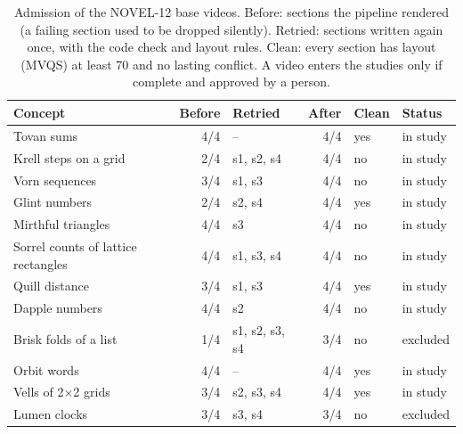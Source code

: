 \begin{table}[t]\centering\small
\caption{Admission of the NOVEL-12 base videos. Before: sections the pipeline rendered (a failing section used to be dropped silently). Retried: sections written again once, with the code check and layout rules. Clean: every section has layout (MVQS) at least 70 and no lasting conflict. A video enters the studies only if complete and approved by a person.}\label{tab:quality}
\begin{tabular}{lrlrll}\toprule Concept & Before & Retried & After & Clean & Status\\\midrule
Tovan sums & 4/4 & -- & 4/4 & yes & in study \\
Krell steps on a grid & 2/4 & s1, s2, s4 & 4/4 & no & in study \\
Vorn sequences & 3/4 & s1, s3 & 4/4 & no & in study \\
Glint numbers & 2/4 & s2, s4 & 4/4 & yes & in study \\
Mirthful triangles & 4/4 & s3 & 4/4 & no & in study \\
Sorrel counts of lattice rectangles & 4/4 & s1, s3, s4 & 4/4 & no & in study \\
Quill distance & 3/4 & s1, s3 & 4/4 & yes & in study \\
Dapple numbers & 4/4 & s2 & 4/4 & no & in study \\
Brisk folds of a list & 1/4 & s1, s2, s3, s4 & 3/4 & no & excluded \\
Orbit words & 4/4 & -- & 4/4 & yes & in study \\
Vells of 2×2 grids & 3/4 & s2, s3, s4 & 4/4 & yes & in study \\
Lumen clocks & 3/4 & s3, s4 & 3/4 & no & excluded \\
\bottomrule\end{tabular}
\end{table}
